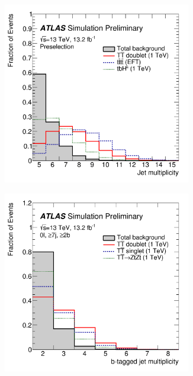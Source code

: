 \begin{figure}[h!]
\begin{subfigure}{0.5\textwidth}
  \centering
  \includegraphics[width=0.9\textwidth]{figures/VLQ/njets.png}
  \caption{}
  \label{fig:vlq:str:njets}
\end{subfigure}
\begin{subfigure}{0.5\textwidth}
  \centering
  \includegraphics[width=0.9\textwidth]{figures/VLQ/nbjets.png}
  \caption{}
  \label{fig:vlq:str:nbjets}
\end{subfigure}


\end{figure}
